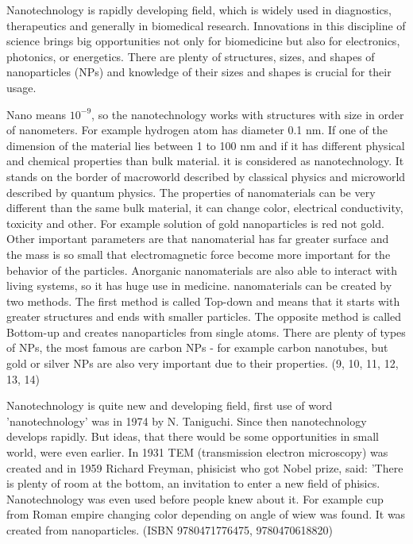 \documentclass[a4paper,12pt]{article}   %
\numberwithin{equation}{section}        %
\begin{document}
        Nanotechnology is rapidly developing field, which is widely used in diagnostics, therapeutics and generally in biomedical research.
        Innovations in this discipline of science brings big opportunities not only for biomedicine but also for electronics, photonics, or energetics.
        There are plenty of structures, sizes, and shapes of nanoparticles (NPs) and knowledge of their sizes and shapes is crucial for their usage.

        Nano means $10^{-9}$, so the nanotechnology works with structures with size in order of nanometers. For example hydrogen atom has diameter 0.1 nm.
        If one of the dimension of the material lies between 1 to 100 nm and if it has different physical and chemical properties than bulk material.
        it is considered as nanotechnology. It stands on the border of macroworld described by classical physics and microworld described by quantum physics.
        The properties of nanomaterials can be very different than the same bulk material, it can change color, electrical conductivity, toxicity and other.
        For example solution of gold nanoparticles is red not gold. Other important parameters are that nanomaterial has far greater surface and the mass is
        so small that electromagnetic force become more important for the behavior of the particles. Anorganic nanomaterials are also able to interact
        with living systems, so it has huge use in medicine. nanomaterials can be created by two methods. The first method is called Top-down and means
        that it starts with greater structures and ends with smaller particles. The opposite method is called Bottom-up and creates nanoparticles from single atoms.
        There are plenty of types of NPs, the most famous are carbon NPs - for example carbon nanotubes, but gold or silver NPs are also very important
        due to their properties. (9, 10, 11, 12, 13, 14)

        Nanotechnology is quite new and developing field, first use of word 'nanotechnology' was in 1974 by N. Taniguchi. Since then nanotechnology develops rapidly.
        But ideas, that there would be some opportunities in small world, were even earlier. In 1931 TEM (transmission electron microscopy) was created and
        in 1959 Richard Freyman, phisicist who got Nobel prize, said: 'There is plenty of room at the bottom, an invitation to enter a new field of phisics.
        Nanotechnology was even used before people knew about it. For example cup from Roman empire changing color depending on angle of wiew was found.
        It was created from nanoparticles. (ISBN 9780471776475, 9780470618820)
\end{document}
